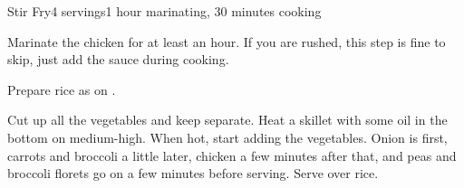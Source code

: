 \documentclass[../Cookbook.tex]{subfiles}
\begin{document}
\begin{recipe}{Stir Fry}{4 servings}{1 hour marinating, 30 minutes cooking}

Marinate the chicken for at least an hour. If you are rushed, this step is fine to skip, just add the sauce during cooking.

Prepare rice as on .

Cut up all the vegetables and keep separate. Heat a skillet with some oil in the bottom on medium-high. When hot, start adding the vegetables. Onion is first, carrots and broccoli a little later, chicken a few minutes after that, and peas and broccoli florets go on a few minutes before serving.
Serve over rice.

\end{recipe}
\end{document}
